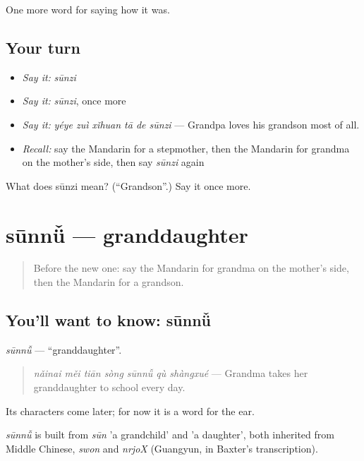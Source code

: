 \begin{grammarlens}[title={What you've built}]
One more word for saying how it was.
\end{grammarlens}

\subsection*{Your turn}
\begin{itemize}
\raggedright
  \item \emph{Say it:} \emph{sūnzi}
  \item \emph{Say it:} \emph{sūnzi}, once more
  \item \emph{Say it:} \emph{yéye zuì xǐhuan tā de sūnzi} — Grandpa loves his grandson most of all.
  \item \emph{Recall:} say the Mandarin for a stepmother, then the Mandarin for grandma on the mother's side, then say \emph{sūnzi} again
\end{itemize}

\begin{tcolorbox}[breakable,colback=teal!4,colframe=teal!35!black,title={Before you move on}]
What does sūnzi mean? (\textquotedblleft{}Grandson\textquotedblright{}.) Say it once more.
\end{tcolorbox}
\section[sūnnǚ]{sūnnǚ — granddaughter}

\label{lesson:ZH-C510-sunnu}



\begin{quote}
Before the new one: say the Mandarin for grandma on the mother's side, then the Mandarin for a grandson.
\end{quote}

\subsection*{You'll want to know: sūnnǚ}
\emph{sūnnǚ} — \textquotedblleft{}granddaughter\textquotedblright{}.

\begin{quote}
\emph{nǎinai měi tiān sòng sūnnǚ qù shàngxué} — Grandma takes her granddaughter to school every day.
\end{quote}

Its characters come later; for now it is a word for the ear.

\begin{cousinweb}
\emph{sūnnǚ} is built from \emph{sūn} 'a grandchild' and  'a daughter', both inherited from Middle Chinese, \emph{swon} and \emph{nrjoX} (Guangyun, in Baxter's transcription).
\end{cousinweb}

